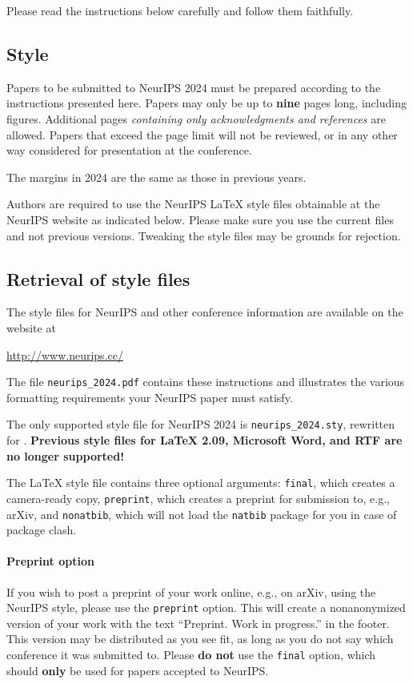 \documentclass{article}
\begin{document}
Please read the instructions below carefully and follow them faithfully.

\subsection{Style}

Papers to be submitted to NeurIPS 2024 must be prepared according to the
instructions presented here. Papers may only be up to {\bf nine} pages long,
including figures. Additional pages \emph{containing only acknowledgments and
references} are allowed. Papers that exceed the page limit will not be
reviewed, or in any other way considered for presentation at the conference.

The margins in 2024 are the same as those in previous years.

Authors are required to use the NeurIPS \LaTeX{} style files obtainable at the
NeurIPS website as indicated below. Please make sure you use the current files
and not previous versions. Tweaking the style files may be grounds for
rejection.

\subsection{Retrieval of style files}

The style files for NeurIPS and other conference information are available on
the website at
\begin{center}
  \url{http://www.neurips.cc/}
\end{center}
The file \verb+neurips_2024.pdf+ contains these instructions and illustrates the
various formatting requirements your NeurIPS paper must satisfy.

The only supported style file for NeurIPS 2024 is \verb+neurips_2024.sty+,
rewritten for \LaTeXe{}.  \textbf{Previous style files for \LaTeX{} 2.09,
  Microsoft Word, and RTF are no longer supported!}

The \LaTeX{} style file contains three optional arguments: \verb+final+, which
creates a camera-ready copy, \verb+preprint+, which creates a preprint for
submission to, e.g., arXiv, and \verb+nonatbib+, which will not load the
\verb+natbib+ package for you in case of package clash.

\paragraph{Preprint option}
If you wish to post a preprint of your work online, e.g., on arXiv, using the
NeurIPS style, please use the \verb+preprint+ option. This will create a
nonanonymized version of your work with the text ``Preprint. Work in progress.''
in the footer. This version may be distributed as you see fit, as long as you do not say which conference it was submitted to. Please \textbf{do
  not} use the \verb+final+ option, which should \textbf{only} be used for
papers accepted to NeurIPS.
\end{document}
